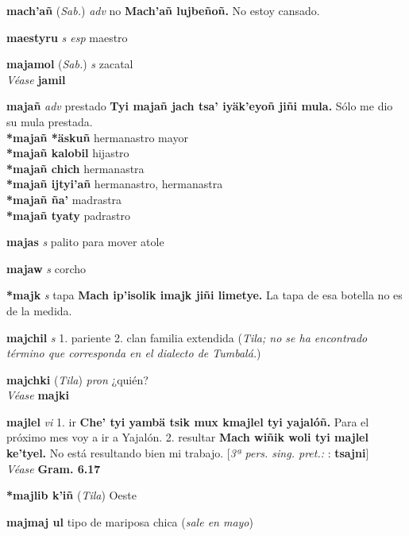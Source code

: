 \documentclass[10pt]{scrbook}
\newcommand{\entry}[1]{\textbf{#1}}
\newcommand{\onedefinition}[1]{#1.}
\newcommand{\partofspeech}[1]{\textit{#1}}
\newcommand{\spanishtranslation}[1]{#1}
\newcommand{\clarification}[1]{(\textit{#1})}
\newcommand{\cholexample}[1]{\textbf{#1}}
\newcommand{\exampletranslation}[1]{#1}
\newcommand{\alsosee}[1]{\\\textit{Véase} \textbf{#1}}
\newcommand{\relevantdialect}[1]{(\textit{#1})}
\newcommand{\secondaryentry}[1]{\\\textbf{#1}}
\newcommand{\secondtranslation}[1]{#1}
\newcommand{\conjugationtense}[1]{[\textit{#1}}
\newcommand{\otherconjugation}[1]{: \textbf{#1}]}
\begin{document}
\begin{multicols}{2}
\entry{mach'añ}
\relevantdialect{Sab.}
\partofspeech{adv}
\spanishtranslation{no}
\cholexample{Mach'añ lujbeñoñ.}
\exampletranslation{No estoy cansado.}

\entry{maestyru}
\partofspeech{s esp}
\spanishtranslation{maestro}

\entry{majamol}
\relevantdialect{Sab.}
\partofspeech{s}
\spanishtranslation{zacatal}
\alsosee{jamil}

\entry{majañ}
\partofspeech{adv}
\spanishtranslation{prestado}
\cholexample{Tyi majañ jach tsa' iyäk'eyoñ jiñi mula.}
\exampletranslation{Sólo me dio su mula prestada.}
\secondaryentry{*majañ *äskuñ}
\secondtranslation{hermanastro mayor}
\secondaryentry{*majañ kalobil}
\secondtranslation{hijastro}
\secondaryentry{*majañ chich}
\secondtranslation{hermanastra}
\secondaryentry{*majañ ijtyi'añ}
\secondtranslation{hermanastro, hermanastra}
\secondaryentry{*majañ ña'}
\secondtranslation{madrastra}
\secondaryentry{*majañ tyaty}
\secondtranslation{padrastro}

\entry{majas}
\partofspeech{s}
\spanishtranslation{palito para mover atole}

\entry{majaw}
\partofspeech{s}
\spanishtranslation{corcho}

\entry{*majk}
\partofspeech{s}
\spanishtranslation{tapa}
\cholexample{Mach ip'isolik imajk jiñi limetye.}
\exampletranslation{La tapa de esa botella no es de la medida.}

\entry{majchil}
\partofspeech{s}
\onedefinition{1}
\spanishtranslation{pariente}
\onedefinition{2}
\spanishtranslation{clan}
\spanishtranslation{familia extendida}
\clarification{Tila; no se ha encontrado término que corresponda en el dialecto de Tumbalá.}

\entry{majchki}
\relevantdialect{Tila}
\partofspeech{pron}
\spanishtranslation{¿quién?}
\alsosee{majki}

\entry{majlel}
\partofspeech{vi}
\onedefinition{1}
\spanishtranslation{ir}
\cholexample{Che' tyi yambä tsik mux kmajlel tyi yajalóñ.}
\exampletranslation{Para el próximo mes voy a ir a Yajalón.}
\onedefinition{2}
\spanishtranslation{resultar}
\cholexample{Mach wiñik woli tyi majlel ke'tyel.}
\exampletranslation{No está resultando bien mi trabajo.}
\conjugationtense{3ª pers. sing. pret.:}
\otherconjugation{tsajni}
\alsosee{Gram. 6.17}

\entry{*majlib k'iñ}
\relevantdialect{Tila}
\spanishtranslation{Oeste}

\entry{majmaj ul}
\spanishtranslation{tipo de mariposa chica}
\clarification{sale en mayo}


\end{multicols}
\end{document}
